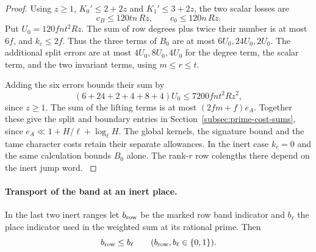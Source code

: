 \begin{proof}
Using \(z\ge1\), \(K_0'\le2+2z\) and \(K_1'\le3+2z\), the two scalar losses are
\[
 c_B\le120t n\,R z,\qquad c_0\le120 n\,R z.
\]
Put
\(U_0=120fnt^2Rz\). The sum of row degrees plus twice their
number is at most \(6f\), and \(k_c\le2f\). Thus the three
terms of \(B_0\) are at most \(6U_0,24U_0,2U_0\).
The additional split errors are at most \(4U_0,8U_0,4U_0\)
for the degree term, the scalar term, and the two invariant
terms, using \(m\le r\le t\).

Adding the six errors bounds their sum by
\[
        (6+24+2+4+8+4)U_0
           \le 7200 fnt^2Rz^2 ,
\]
since \(z\ge1\). The sum of the lifting terms is at most
\((2fm+f)e_A\). Together these give the split and boundary
entries in Section~\ref{subsec:prime-cost-sums}, since
\(e_A\ll 1+H/\ell+\log_\ell H\). The global kernels, the
signature bound and the tame character costs retain their
separate allowances. In the inert case \(k_c=0\) and the
same calculation bounds \(B_0\) alone. The rank-\(r\) row
colengths there depend on the inert jump word.
\label{cor:unramified-split-length-6}
\end{proof}

\paragraph{Transport of the band at an inert place.}
\begin{lemma}
\label{lem:inert-place-band}
In the last two inert ranges let \(b_{\rm row}\) be the marked row band indicator and \(b_\ell\) the place indicator used in the weighted sum at its rational prime. Then
\[
 b_{\rm row}\le b_\ell\qquad(b_{\rm row},b_\ell\in\{0,1\}).
\]
\end{lemma}

